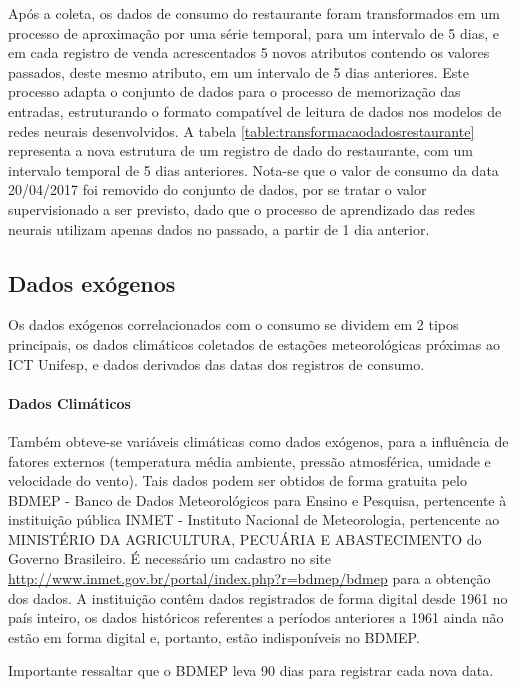             Após a coleta, os dados de consumo do restaurante foram transformados em um processo de aproximação por uma série temporal, para um intervalo de 5 dias, e em cada registro de venda  acrescentados 5 novos atributos contendo os valores passados, deste mesmo atributo, em um intervalo de 5 dias anteriores. Este processo adapta o conjunto de dados para o processo de memorização das entradas, estruturando o formato compatível de leitura de dados nos modelos de redes neurais desenvolvidos. A tabela \ref{table:transformacaodadosrestaurante} representa a nova estrutura de um registro de dado do restaurante, com um intervalo temporal de 5 dias anteriores. Nota-se que o valor de consumo da data 20/04/2017 foi removido do conjunto de dados, por se tratar o valor supervisionado a ser previsto, dado que o processo de aprendizado das redes neurais utilizam apenas dados no passado, a partir de 1 dia anterior.
            
           
        \subsection{Dados exógenos}
            Os dados exógenos correlacionados com o consumo se dividem em 2 tipos principais, os dados climáticos coletados de estações meteorológicas próximas ao ICT Unifesp, e dados derivados das datas dos registros de consumo.
            
            \paragraph{Dados Climáticos}
            	Também obteve-se variáveis climáticas como dados exógenos, para a influência de fatores externos (temperatura média ambiente, pressão atmosférica, umidade e velocidade do vento). Tais dados podem ser obtidos de forma gratuita pelo BDMEP - Banco de Dados Meteorológicos para Ensino e Pesquisa, pertencente à instituição pública INMET - Instituto Nacional de Meteorologia, pertencente ao MINISTÉRIO DA AGRICULTURA, PECUÁRIA E ABASTECIMENTO do Governo Brasileiro. É necessário um cadastro no site \url{http://www.inmet.gov.br/portal/index.php?r=bdmep/bdmep} para a obtenção dos dados. A instituição contêm dados registrados de forma digital desde 1961 no país inteiro, os dados históricos referentes a períodos anteriores a 1961 ainda não estão em forma digital e, portanto, estão indisponíveis no BDMEP.
            	
            	Importante ressaltar que o BDMEP leva 90 dias para registrar cada nova data.
            	

